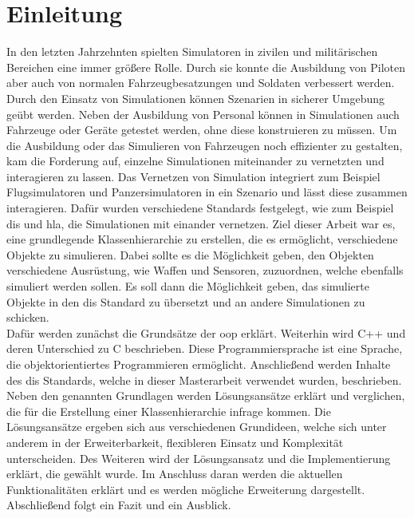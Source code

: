 \chapter{Einleitung}\label{Einleitung}
\onehalfspacing
In den letzten Jahrzehnten spielten Simulatoren in zivilen und militärischen Bereichen eine immer größere Rolle. Durch sie konnte die Ausbildung von Piloten aber auch von normalen Fahrzeugbesatzungen und Soldaten verbessert werden. Durch den Einsatz von Simulationen können Szenarien in sicherer Umgebung geübt werden. Neben der Ausbildung von Personal können in Simulationen auch Fahrzeuge oder Geräte getestet werden, ohne diese konstruieren zu müssen. 
Um die Ausbildung oder das Simulieren von Fahrzeugen noch effizienter zu gestalten, kam die Forderung auf, einzelne Simulationen miteinander zu vernetzten und interagieren zu lassen. Das Vernetzen von Simulation integriert zum Beispiel Flugsimulatoren und Panzersimulatoren in ein Szenario und lässt diese zusammen interagieren. 
Dafür wurden verschiedene Standards festgelegt, wie zum Beispiel \ac{dis} und \ac{hla}, die Simulationen mit einander vernetzen. Ziel dieser Arbeit war es, eine grundlegende Klassenhierarchie zu erstellen, die es ermöglicht, verschiedene Objekte zu simulieren. Dabei sollte es die Möglichkeit geben, den Objekten verschiedene Ausrüstung, wie Waffen und Sensoren, zuzuordnen, welche ebenfalls simuliert werden sollen. Es soll dann die Möglichkeit geben, das simulierte Objekte in den \ac{dis} Standard zu übersetzt und an andere Simulationen zu schicken.  \\
Dafür werden zunächst die Grundsätze der \ac{oop} erklärt. Weiterhin wird C++ und deren Unterschied zu C beschrieben. Diese Programmiersprache ist eine Sprache, die objektorientiertes Programmieren ermöglicht. Anschließend werden  Inhalte des \ac{dis} Standards, welche in dieser Masterarbeit verwendet wurden, beschrieben. Neben den genannten Grundlagen werden Lösungsansätze erklärt und verglichen, die für die Erstellung einer Klassenhierarchie infrage kommen. Die Lösungsansätze ergeben sich aus verschiedenen Grundideen, welche sich unter anderem in der Erweiterbarkeit, flexibleren Einsatz und Komplexität unterscheiden.   Des Weiteren wird der Lösungsansatz und die Implementierung  erklärt, die gewählt wurde. Im Anschluss daran werden die aktuellen Funktionalitäten erklärt und es werden mögliche Erweiterung dargestellt. Abschließend folgt ein Fazit und ein Ausblick.  
       